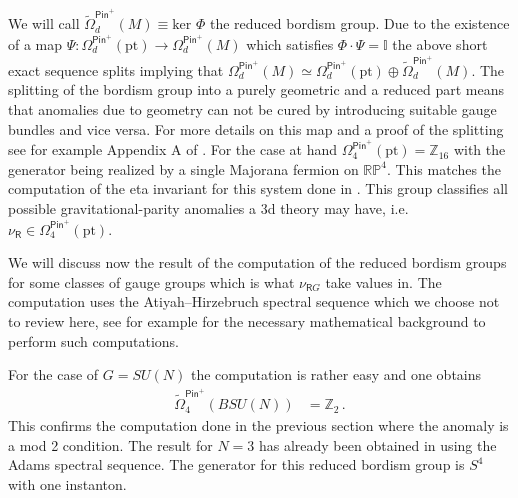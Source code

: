 \documentclass[12pt]{article}%
\numberwithin{equation}{section}
\newcommand{\al}[1]{\begin{align}#1\end{align}}
\renewcommand{\(}{\left(}
\renewcommand{\)}{\right)}
\renewcommand{\[}{\left[}
\renewcommand{\]}{\right]}
\begin{document}
We will call $\widetilde \Omega^{\mathsf{Pin}^+}_d(M) \equiv \text{ker } \Phi$ the reduced bordism group. Due to the existence of a map $\Psi : \Omega^{\mathsf{Pin}^+}_d(\text{pt}) \rightarrow \Omega^{\mathsf{Pin}^+}_d(M) $ which satisfies $\Phi \cdot \Psi = \mathbb I$ the above short exact sequence splits implying that $\Omega_d^{\mathsf{Pin}^+}(M)\simeq \Omega_d^{\mathsf{Pin}^+}(\text{pt})\oplus \widetilde \Omega_d^{\mathsf{Pin}^+}(M)$. The splitting of the bordism group into a purely geometric and a reduced part means that anomalies due to geometry can not be cured by introducing suitable gauge bundles and vice versa. For more details on this map and a proof of the splitting see for example Appendix A of \cite{Garcia-Etxebarria:2018ajm}. For the case at hand $ \Omega^{\mathsf{Pin}^+}_4(\text{pt}) = \mathbb Z_{16}$ with the generator being realized by a single Majorana fermion on $\mathbb{RP}^4$. This matches the computation of the eta invariant for this system done in \cite{Witten:2015aba}. This group classifies all possible gravitational-parity anomalies a 3d theory may have, i.e. $\nu_{\mathsf{R}}\in\Omega^{\mathsf{Pin}^+}_4(\text{pt})$.

We will discuss now the result of the computation of the reduced bordism groups for some classes of gauge groups which is what $\nu_{\mathsf{R}G}$ take values in. The computation uses the Atiyah--Hirzebruch spectral sequence which we choose not to review here, see for example \cite{Garcia-Etxebarria:2018ajm} for the necessary mathematical background to perform such computations.

For the case of $G=SU(N)$ the computation is rather easy and one obtains
%
\al{\widetilde \Omega^{\mathsf{Pin}^+}_4 (BSU(N)) &= \mathbb Z_2\,.
}
%
This confirms the computation done in the previous section where the anomaly is a mod 2 condition. The result for $N=3$ has already been obtained in \cite{Guo:2017xex} using the Adams spectral sequence. The
generator for this reduced bordism group is $S^4$ with one instanton.
\end{document}
